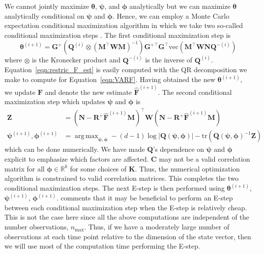 \documentclass[notitlepage]{article}
\DeclareMathOperator*{\argmax}{arg\,max}
\renewcommand{\vec}[1]{\bm{#1}}
\newcommand{\mat}[1]{\mathbf{#1}}
\newcommand{\Lparen}[1]{\left( #1\right)}
\newcommand{\Lvert}[1]{\left\vert #1\right\vert}
\newcommand{\optor}[2]{#1\Lparen{#2}}
\newcommand{\vecOP}[1]{\optor{\text{vec}}{#1}}
\newcommand{\nPeriods}{d}
\newcommand{\nMax}{n_{\text{max}}}
\begin{document}
We cannot jointly maximize $\vec{\theta}$, $\vec{\psi}$, and $\vec{\phi}$ analytically but we can maximize $\vec{\theta}$ analytically conditional on $\vec{\psi}$ and $\vec{\phi}$. Hence, we can employ a Monte Carlo expectation conditional maximization algorithm in which we take two so-called conditional maximization steps \citep[see][for the, non-Monte Carlo, expectation maximization algorithm]{meng93}. 
The first conditional maximization step is %
%
\begin{equation}\label{eqn:restric_F_est}
\vec{\theta}^{(i + 1)} =
	\mat{G}^+
	\Lparen{\mat{Q}^{(i)} \otimes \Lparen{\mat{M}^\top\mat{W}\mat{M}}^{-1}}
	\mat{G}^{+\top}\mat{G}^\top	
	\vecOP{\mat{M}^\top\mat{W}\mat{N}\mat{Q}^{-(i)}}
\end{equation}%
% 
where $\otimes$ is the Kronecker product and $\mat{Q}^{-(i)}$ is the inverse 
of $\mat{Q}^{(i)}$. Equation~\eqref{eqn:restric_F_est} is easily computed 
with the QR decomposition we 
make to compute for Equation~\eqref{eqn:VARF}. Having obtained the new 
$\vec{\theta}^{(i + 1)}$, we update $\mat{F}$  
and denote the new 
estimate $\widehat{\mat{F}}^{(i + 1)}$. The second conditional maximization 
step which updates $\vec{\psi}$ and $\vec{\phi}$ is %
%
\begin{align*}
\mat{Z} &= \Lparen{\mat{N} - \mat{R}^+\widehat{\mat{F}}^{(i +1)}\mat{M}}^\top\mat{W}
           \Lparen{\mat{N} - \mat{R}^+\widehat{\mat{F}}^{(i +1)}\mat{M}} \\
\vec{\psi}^{(i+1)},\vec{\phi}^{(i+1)} &= \argmax_{\vec{\psi},\vec{\phi}} 
   -(\nPeriods - 1)\log\Lvert{\mat{Q}(\vec{\psi},\vec{\phi})}
   -\text{tr}\Lparen{\mat{Q}(\vec{\psi},\vec{\phi})^{-1}\mat{Z}}
\end{align*}%
% 
which can be done numerically. We have made $\mat{Q}$'s dependence on $\vec{\psi}$ and $\vec{\phi}$ explicit to emphasize which factors are affected. $\mat{C}$ may not be a valid correlation matrix for all $\vec\phi\in\mathbb{R}^k$ for some choices of $\mat{K}$. Thus, the numerical optimization algorithm is constrained to valid correlation matrices. This completes the two conditional maximization steps. The next E-step is then performed using $\vec{\theta}^{(i + 1)}$, $\vec{\psi}^{(i +1)}$, $\vec{\phi}^{(i + 1)}$. \citet[][see the discussion]{meng93} comments that it may be beneficial to perform an E-step between each conditional maximization step when the E-step is relatively cheap. 
This is not the case here since all the above computations are independent 
of the number observations, $\nMax$.
Thus, if we have a moderately large number of observations at each time point relative to 
the dimension of the state vector, then we will use most of the 
computation time performing the E-step.
\end{document}
